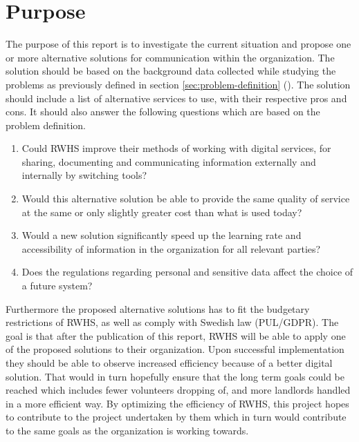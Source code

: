 
\section{Purpose}
The purpose of this report is to investigate the current situation and propose one or more alternative solutions for communication within the organization. The solution should be based on the background data collected while studying the problems as previously defined in section \ref{sec:problem-definition} (\textit{}). The solution should include a list of alternative services to use, with their respective pros and cons. It should also answer the following questions which are based on the problem definition.
\begin{enumerate}
\item Could RWHS improve their methods of working with digital services, for sharing, documenting and communicating information externally and internally by switching tools?
\item Would this alternative solution be able to provide the same quality of service at the same or only slightly greater cost than what is used today?
\item Would a new solution significantly speed up the learning rate and accessibility of information in the organization for all relevant parties?
\item Does the regulations regarding personal and sensitive data affect the choice of a future system?
\end{enumerate}
Furthermore the proposed alternative solutions has to fit the budgetary restrictions of RWHS, as well as comply with Swedish law (PUL/GDPR). The goal is that after the publication of this report, RWHS will be able to apply one of the proposed solutions to their organization. Upon successful implementation they should be able to observe increased efficiency because of a better digital solution. That would in turn hopefully ensure that the long term goals could be reached which includes fewer volunteers dropping of, and more landlords handled in a more efficient way. By optimizing the efficiency of RWHS, this project hopes to contribute to the project undertaken by them which in turn would contribute to  the same goals as the organization is working towards.







